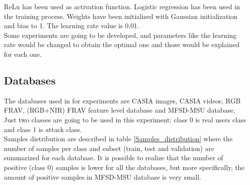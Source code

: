 ReLu has been used as activation function. Logistic regression has been used in the training process. Weights have been initialized with Gaussian initialization and bias to 1. The learning rate value is 0.01.\\

Some experiments are going to be developed, and parameters like the learning rate would be changed to obtain the optimal one and those would be explained for each one.

\subsection{Databases} \label{subssec:ejec1_database}
The databases used in for experiments are CASIA images, CASIA videos, RGB FRAV, (RGB+NIR) FRAV feature level database and MFSD-MSU database. Just two classes are going to be used in this experiment: class 0 is real users class and class 1 is attack class.\\

Samples distribution are described in table \ref{Samples_distribution} where the number of samples per class and  subset (train, test and validation) are summarized for each database. It is possible to realize that the number of positive (class 0) samples is lower for all the databases, but more specifically, the amount of positive samples in MFSD-MSU database is very small.\\

